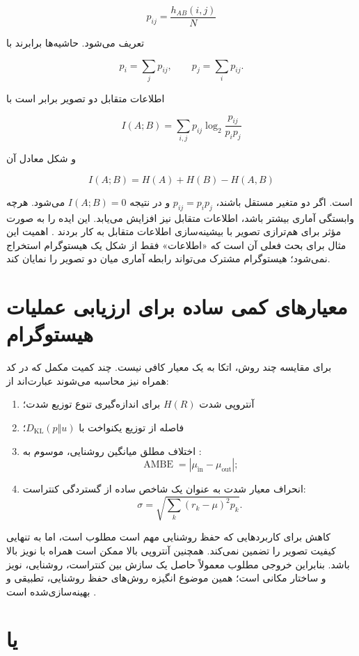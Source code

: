 \documentclass[12pt,a4paper]{article}
\begin{document}
\[
 p_{ij}
 =
 \frac{h_{AB}(i,j)}{N}
\]

تعریف می‌شود. حاشیه‌ها برابرند با

\[
 p_i=\sum_j p_{ij},
 \qquad
 p_j=\sum_i p_{ij}.
\]

اطلاعات متقابل دو تصویر برابر است با

\[
 \boxed{
 I(A;B)=
 \sum_{i,j}p_{ij}
 \log_2\frac{p_{ij}}{p_i p_j}
 }
\]

و شکل معادل آن

\[
 I(A;B)=H(A)+H(B)-H(A,B)
\]

است. اگر دو متغیر مستقل باشند، $p_{ij}=p_i p_j$ و در نتیجه $I(A;B)=0$ می‌شود.
هرچه وابستگی آماری بیشتر باشد، اطلاعات متقابل نیز افزایش می‌یابد. 
این ایده را به صورت مؤثر برای هم‌ترازی تصویر با بیشینه‌سازی اطلاعات متقابل به کار
بردند \cite{viola1997}. اهمیت این مثال برای بحث فعلی آن است که «اطلاعات» فقط از شکل
یک هیستوگرام استخراج نمی‌شود؛ هیستوگرام مشترک می‌تواند رابطه آماری میان دو تصویر را
نمایان کند.

\section{معیارهای کمی ساده برای ارزیابی عملیات هیستوگرام}

برای مقایسه چند روش، اتکا به یک معیار کافی نیست. چند کمیت مکمل که در کد همراه نیز
محاسبه می‌شوند عبارت‌اند از:

\begin{enumerate}
 \item آنتروپی شدت $H(R)$ برای اندازه‌گیری تنوع توزیع شدت؛
 \item فاصله از توزیع یکنواخت با $D_{\mathrm{KL}}(p\Vert u)$؛
 \item اختلاف مطلق میانگین روشنایی، موسوم به :
 \[
 \operatorname{AMBE}=|\mu_{\mathrm{in}}-\mu_{\mathrm{out}}|;
 \]
 \item انحراف معیار شدت به عنوان یک شاخص ساده از گستردگی کنتراست:
 \[
 \sigma=\sqrt{\sum_k(r_k-\mu)^2p_k}.
 \]
\end{enumerate}

کاهش  برای کاربردهایی که حفظ روشنایی مهم است مطلوب است، اما به تنهایی کیفیت
تصویر را تضمین نمی‌کند. همچنین آنتروپی بالا ممکن است همراه با نویز بالا باشد. بنابراین
خروجی مطلوب معمولاً حاصل یک سازش بین کنتراست، روشنایی، نویز و ساختار مکانی است؛ همین
موضوع انگیزه روش‌های حفظ روشنایی، تطبیقی و بهینه‌سازی‌شده است
\cite{kim1997,pizer1987,arici2009}.


\section{ یا }
	
\end{document}
